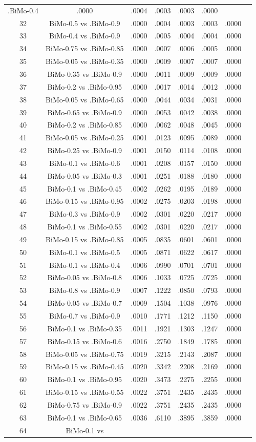 \documentclass[a4paper,10pt]{article}
\begin{document}
\begin{landscape}
\begin{table}[!htp]
\begin{tabular}{cccccccc}
.BiMo-0.4&.0000&.0004&.0003&.0003&.0000\\32&BiMo-0.5 vs .BiMo-0.9&.0000&.0004&.0003&.0003&.0000\\33&BiMo-0.4 vs .BiMo-0.9&.0000&.0005&.0004&.0004&.0000\\34&BiMo-0.75 vs .BiMo-0.85&.0000&.0007&.0006&.0005&.0000\\35&BiMo-0.05 vs .BiMo-0.35&.0000&.0009&.0007&.0007&.0000\\36&BiMo-0.35 vs .BiMo-0.9&.0000&.0011&.0009&.0009&.0000\\37&BiMo-0.2 vs .BiMo-0.95&.0000&.0017&.0014&.0012&.0000\\38&BiMo-0.05 vs .BiMo-0.65&.0000&.0044&.0034&.0031&.0000\\39&BiMo-0.65 vs .BiMo-0.9&.0000&.0053&.0042&.0038&.0000\\40&BiMo-0.2 vs .BiMo-0.85&.0000&.0062&.0048&.0045&.0000\\41&BiMo-0.05 vs .BiMo-0.25&.0001&.0123&.0095&.0089&.0000\\42&BiMo-0.25 vs .BiMo-0.9&.0001&.0150&.0114&.0108&.0000\\43&BiMo-0.1 vs .BiMo-0.6&.0001&.0208&.0157&.0150&.0000\\44&BiMo-0.05 vs .BiMo-0.3&.0001&.0251&.0188&.0180&.0000\\45&BiMo-0.1 vs .BiMo-0.45&.0002&.0262&.0195&.0189&.0000\\46&BiMo-0.15 vs .BiMo-0.95&.0002&.0275&.0203&.0198&.0000\\47&BiMo-0.3 vs .BiMo-0.9&.0002&.0301&.0220&.0217&.0000\\48&BiMo-0.1 vs .BiMo-0.55&.0002&.0301&.0220&.0217&.0000\\49&BiMo-0.15 vs .BiMo-0.85&.0005&.0835&.0601&.0601&.0000\\50&BiMo-0.1 vs .BiMo-0.5&.0005&.0871&.0622&.0617&.0000\\51&BiMo-0.1 vs .BiMo-0.4&.0006&.0990&.0701&.0701&.0000\\52&BiMo-0.05 vs .BiMo-0.8&.0006&.1033&.0725&.0725&.0000\\53&BiMo-0.8 vs .BiMo-0.9&.0007&.1222&.0850&.0793&.0000\\54&BiMo-0.05 vs .BiMo-0.7&.0009&.1504&.1038&.0976&.0000\\55&BiMo-0.7 vs .BiMo-0.9&.0010&.1771&.1212&.1150&.0000\\56&BiMo-0.1 vs .BiMo-0.35&.0011&.1921&.1303&.1247&.0000\\57&BiMo-0.15 vs .BiMo-0.6&.0016&.2750&.1849&.1785&.0000\\58&BiMo-0.05 vs .BiMo-0.75&.0019&.3215&.2143&.2087&.0000\\59&BiMo-0.15 vs .BiMo-0.45&.0020&.3342&.2208&.2169&.0000\\60&BiMo-0.1 vs .BiMo-0.95&.0020&.3473&.2275&.2255&.0000\\61&BiMo-0.15 vs .BiMo-0.55&.0022&.3751&.2435&.2435&.0000\\62&BiMo-0.75 vs .BiMo-0.9&.0022&.3751&.2435&.2435&.0000\\63&BiMo-0.1 vs .BiMo-0.65&.0036&.6110&.3895&.3859&.0000\\64&BiMo-0.1 vs 
\end{tabular}
\end{table}
\end{landscape}
\end{document}

